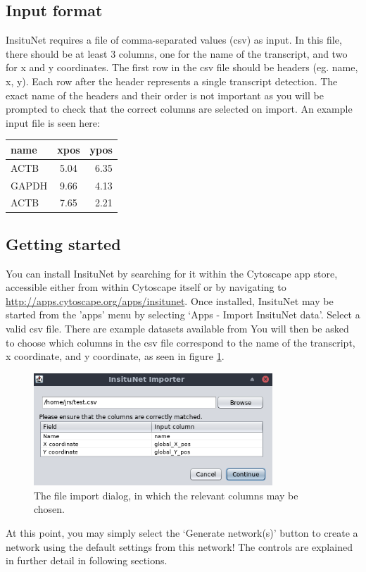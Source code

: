 \documentclass[a4paper,12pt]{article}
\begin{document}
\subsection{Input format}
InsituNet requires a file of comma-separated values (csv) as input. In this file, there should be at least 3 columns, one for the name of the transcript, and two for x and y coordinates. The first row in the csv file should be headers (eg. name, x, y). Each row after the header represents a single transcript detection. The exact name of the headers and their order is not important as you will be prompted to check that the correct columns are selected on import. An example input file is seen here:

\begin{center}
\begin{tabular}{ l c r }
	\centering
	name & xpos & ypos \\ \hline
	ACTB & 5.04 & 6.35 \\
	GAPDH & 9.66 & 4.13 \\
	ACTB & 7.65 & 2.21 \\
\end{tabular}
\end{center}

\subsection{Getting started}
You can install InsituNet by searching for it within the Cytoscape app store, accessible either from within Cytoscape itself or by navigating to  \url{http://apps.cytoscape.org/apps/insitunet}. Once installed, InsituNet may be started from the 'apps' menu by selecting `Apps - Import InsituNet data'. Select a valid csv file. There are example datasets available from You will then be asked to choose which columns in the csv file correspond to the name of the transcript, x coordinate, and y coordinate, as seen in figure \ref{fig:sel}.
\begin{figure}[htb]
 	\caption{The file import dialog, in which the relevant columns may be chosen.}\label{fig:sel}
 	\centering
 	\includegraphics[width=0.8\textwidth]{sel}
\end{figure}
At this point, you may simply select the `Generate network(s)' button to create a network using the default settings from this network! The controls are explained in further detail in following sections.
\end{document}
